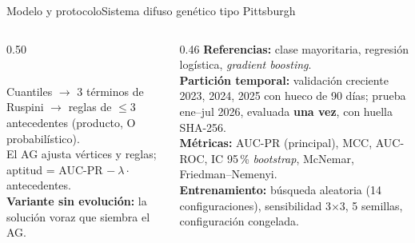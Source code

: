 \documentclass[aspectratio=169,10pt]{beamer}
\begin{document}
\begin{frame}{Modelo y protocolo}{Sistema difuso genético tipo Pittsburgh}
  \begin{columns}[T,onlytextwidth]
    \begin{column}{0.50\textwidth}
      \\[3pt]
      {\fontsize{8pt}{9.5pt}\selectfont
      Cuantiles $\to$ 3 términos de Ruspini $\to$ reglas de $\le$3 antecedentes (producto, O probabilístico).\\
      El AG ajusta vértices y reglas; aptitud = AUC-PR $-\ \lambda\cdot$antecedentes.\\
      \textbf{Variante sin evolución:} la solución voraz que siembra el AG.}
    \end{column}
    \begin{column}{0.46\textwidth}
      {\fontsize{8pt}{9.5pt}\selectfont
      \textbf{Referencias:} clase mayoritaria, regresión logística, \emph{gradient boosting}.\\[4pt]
      \textbf{Partición temporal:} validación creciente 2023, 2024, 2025 con hueco de 90 días; prueba ene--jul 2026, evaluada \textbf{una vez}, con huella SHA-256.\\[4pt]
      \textbf{Métricas:} AUC-PR (principal), MCC, AUC-ROC, IC 95\,\% \emph{bootstrap}, McNemar, Friedman--Nemenyi.\\[4pt]
      \textbf{Entrenamiento:} búsqueda aleatoria (14 configuraciones), sensibilidad 3$\times$3, 5 semillas, configuración congelada.}
    \end{column}
  \end{columns}
\end{frame}
\end{document}
